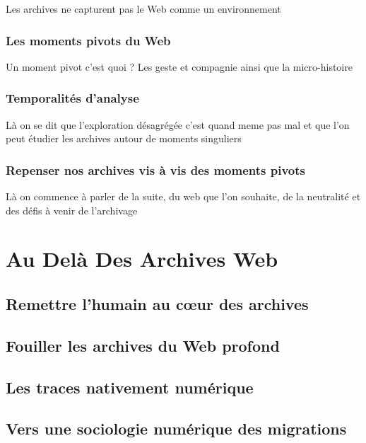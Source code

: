 \documentclass{tufte-book}
\begin{document}
Les archives ne capturent pas le Web comme un environnement

\subsection{Les moments pivots du Web}

Un moment pivot c'est quoi ? Les geste et compagnie ainsi que la micro-histoire

\subsection{Temporalités d'analyse}

Là on se dit que l'exploration désagrégée c'est quand meme pas mal et que l'on peut étudier les archives autour de moments singuliers

\subsection{Repenser nos archives vis à vis des moments pivots}

Là on commence à parler de la suite, du web que l'on souhaite, de la neutralité et des défis à venir de l'archivage


\chapter{Au Delà Des Archives Web}

\section{Remettre l'humain au cœur des archives}

\section{Fouiller les archives du Web profond}

\section{Les traces nativement numérique}

\section{Vers une sociologie numérique des migrations}
\end{document}
